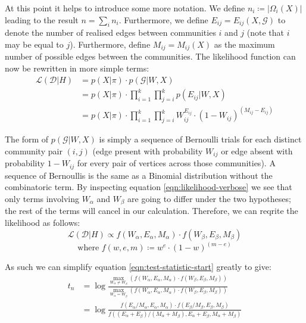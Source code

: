 \documentclass[]{article}
\newcommand{\Dcal}{\mathcal{D}}
\newcommand{\Gcal}{\mathcal{G}}
\newcommand{\lik}{\mathcal{L}}
\begin{document}
At this point it helps to introduce some more notation. We define $n_i \coloneqq |\Omega_i(X)|$ leading to the result $n = \sum_i n_i$. Furthermore, we define $E_{ij} = E_{ij}(X, \Gcal)$ to denote the number of realised edges between communities $i$ and $j$ (note that $i$ may be equal to $j$). Furthermore, define $M_{ij} = M_{ij}(X)$ as the maximum number of possible edges between the communities. The likelihood function can now be rewritten in more simple terms:
%
\begin{align}
\lik(\Dcal | H) &= p(X| \pi) \cdot p(\Gcal | W, X) \nonumber \\
&= p(X | \pi) \cdot \prod_{i=1}^{k} \prod_{j=i}^{k} p(E_{ij} | W, X) \nonumber \\
&= p(X | \pi) \cdot \prod_{i=1}^{k} \prod_{j=i}^{k} W_{ij} ^ {E_{ij}} \cdot \left( 1 - W_{ij} \right) ^ {(M_{ij} - E_{ij})}
\label{eqn:likelihood-verbose}
\end{align}

The form of $p(\Gcal | W, X)$ is simply a sequence of Bernoulli trials for each distinct community pair $(i, j)$ (edge present with probability $W_{ij}$ or edge absent with probability $1 - W_{ij}$ for every pair of vertices across those communities). A sequence of Bernoullis is the same as a Binomial distribution without the combinatoric term. By inspecting equation \ref{eqn:likelihood-verbose} we see that only terms involving $W_{\alpha}$ and $W_{\beta}$ are going to differ under the two hypotheses; the rest of the terms will cancel in our calculation. Therefore, we can reqrite the likelihood as follows:
%
\begin{equation}
	\lik (\Dcal | H) \propto f (W_\alpha, E_\alpha, M_\alpha) \cdot f (W_\beta, E_\beta, M_\beta)
\end{equation} 
\begin{equation}
	\textrm{where } f (w, e, m) \coloneqq w^e \cdot (1-w)^{(m - e)}
\end{equation}

As such we can simplify equation \ref{eqn:test-statistic-start} greatly to give:
%
\begin{align}
	t_n &= \log \frac
	{
		\max_{W_{\alpha} \neq W_{\beta}}(f (W_\alpha, E_\alpha, M_\alpha) \cdot f (W_\beta, E_\beta, M_\beta))
	}
	{
		\max_{W_\alpha = W_\beta} (f (W_\alpha, E_\alpha, M_\alpha) \cdot f (W_\beta, E_\beta, M_\beta))
	} \nonumber \\
	&= \log \frac{f(E_\alpha / M_\alpha, E_\alpha, M_\alpha) \cdot f(E_\beta / M_\beta, E_\beta, M_\beta)}
	{f \left( (E_\alpha + E_\beta)/(M_\alpha + M_\beta), E_\alpha + E_\beta, M_\alpha + M_\beta \right)}
\end{align}
\end{document}
